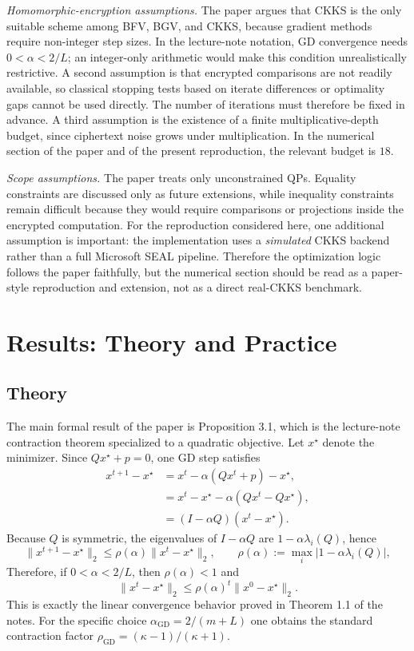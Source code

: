 \documentclass[10pt,english]{article}
\begin{document}
\textit{Homomorphic-encryption assumptions.} The paper argues that CKKS is the only suitable scheme among BFV, BGV, and CKKS, because gradient methods require non-integer step sizes. In the lecture-note notation, GD convergence needs $0<\alpha<2/L$; an integer-only arithmetic would make this condition unrealistically restrictive. A second assumption is that encrypted comparisons are not readily available, so classical stopping tests based on iterate differences or optimality gaps cannot be used directly. The number of iterations must therefore be fixed in advance. A third assumption is the existence of a finite multiplicative-depth budget, since ciphertext noise grows under multiplication. In the numerical section of the paper and of the present reproduction, the relevant budget is $18$.

\textit{Scope assumptions.} The paper treats only unconstrained QPs. Equality constraints are discussed only as future extensions, while inequality constraints remain difficult because they would require comparisons or projections inside the encrypted computation. For the reproduction considered here, one additional assumption is important: the implementation uses a \emph{simulated} CKKS backend rather than a full Microsoft SEAL pipeline. Therefore the optimization logic follows the paper faithfully, but the numerical section should be read as a paper-style reproduction and extension, not as a direct real-CKKS benchmark.

\section{Results: Theory and Practice}

\subsection{Theory}

The main formal result of the paper is Proposition 3.1, which is the lecture-note contraction theorem specialized to a quadratic objective. Let $x^\star$ denote the minimizer. Since $Qx^\star+p=0$, one GD step satisfies
\[
\begin{aligned}
x^{t+1}-x^\star
&=x^t-\alpha(Qx^t+p)-x^\star, \\
&=x^t-x^\star-\alpha(Qx^t-Qx^\star), \\
&=(I-\alpha Q)(x^t-x^\star).
\end{aligned}
\]
Because $Q$ is symmetric, the eigenvalues of $I-\alpha Q$ are $1-\alpha\lambda_i(Q)$, hence
\[
\|x^{t+1}-x^\star\|_2
\le
\rho(\alpha)\|x^t-x^\star\|_2,
\qquad
\rho(\alpha):=\max_i |1-\alpha\lambda_i(Q)|,
\]
Therefore, if $0<\alpha<2/L$, then $\rho(\alpha)<1$ and
\[
\|x^t-x^\star\|_2 \le \rho(\alpha)^t \|x^0-x^\star\|_2.
\]
This is exactly the linear convergence behavior proved in Theorem 1.1 of the notes. For the specific choice $\alpha_{\mathrm{GD}}=2/(m+L)$ one obtains the standard contraction factor $\rho_{\mathrm{GD}}=(\kappa-1)/(\kappa+1)$.
\end{document}
